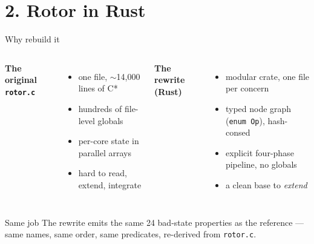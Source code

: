 \documentclass[aspectratio=169]{beamer}
\begin{document}
\section{2. Rotor in Rust}

\begin{frame}{Why rebuild it}
  \begin{columns}[T]
      \textbf{The original \texttt{rotor.c}}
      \begin{itemize}\setlength\itemsep{0.25em}\footnotesize
        \item one file, $\sim$14{,}000 lines of C*
        \item hundreds of file-level globals
        \item per-core state in parallel arrays
        \item hard to read, extend, integrate
      \end{itemize}
      \textbf{The rewrite (Rust)}
      \begin{itemize}\setlength\itemsep{0.25em}\footnotesize
        \item modular crate, one file per concern
        \item typed node graph (\texttt{enum Op}), hash-consed
        \item explicit four-phase pipeline, no globals
        \item a clean base to \emph{extend}
      \end{itemize}
  \end{columns}
  \vfill
  \begin{block}{Same job}
    The rewrite emits the \alert{same 24 bad-state properties} as the
    reference --- same names, same order, same predicates, re-derived from
    \texttt{rotor.c}.
  \end{block}
\end{frame}
\end{document}
